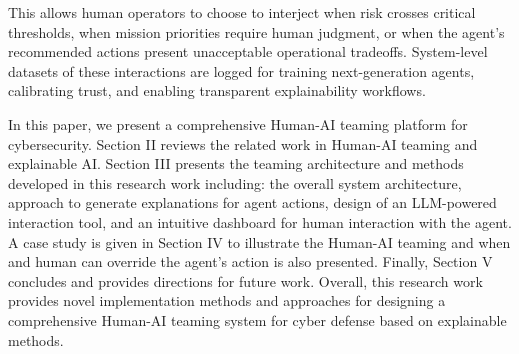 This allows human operators to choose to interject when risk crosses critical thresholds, when mission priorities require human judgment, or when the agent’s recommended actions present unacceptable operational tradeoffs. 
System-level datasets of these interactions are logged for training next-generation agents, calibrating trust, and enabling transparent explainability workflows.

In this paper, we present a comprehensive Human-AI teaming platform for cybersecurity. Section II reviews the related work in Human-AI teaming and explainable AI. Section III presents the teaming architecture and methods developed in this research work including: the overall system architecture, approach to generate explanations for agent actions, design of an LLM-powered interaction tool, and an intuitive dashboard for human interaction with the agent. A case study is given in Section IV to illustrate the Human-AI teaming and when and human can override the agent's action is also presented. Finally, Section V concludes and provides directions for future work. Overall, this research work provides novel implementation methods and approaches for designing a comprehensive Human-AI teaming system for cyber defense based on explainable methods.